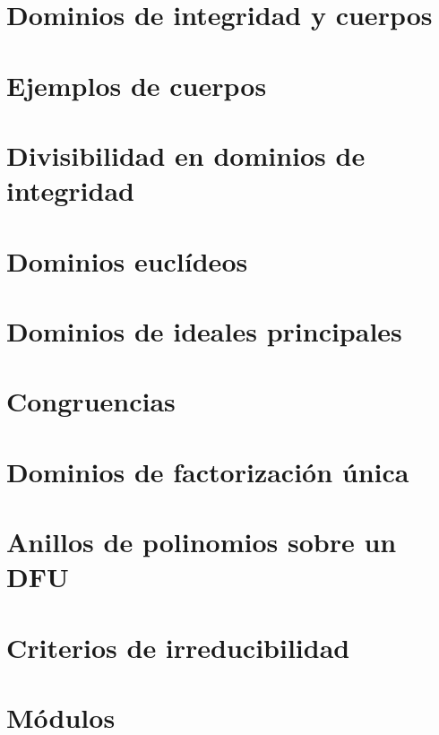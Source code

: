 \documentclass{article}
\theoremstyle{theorem-style}  %
\theoremstyle{definition-style}
\theoremstyle{example-style}
\begin{document}
\section{Dominios de integridad y cuerpos}

\pagebreak
\section{Ejemplos de cuerpos}

\pagebreak
\section{Divisibilidad en dominios de integridad}

\pagebreak
\section{Dominios euclídeos}

\pagebreak
\section{Dominios de ideales principales}

\pagebreak
\section{Congruencias}

\pagebreak
\section{Dominios de factorización única}

\pagebreak
\section{Anillos de polinomios sobre un DFU}

\pagebreak
\section{Criterios de irreducibilidad}

\pagebreak
\section{Módulos}

\pagebreak

\nocite{*}
\printbibliography
\end{document}
